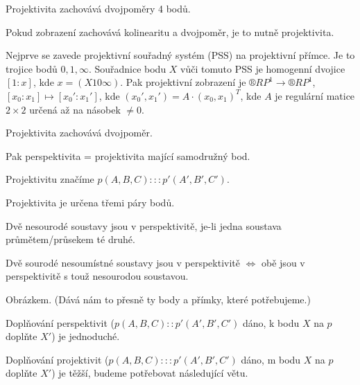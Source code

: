 \documentclass[12pt]{article}					%
\begin{document}
\begin{dusledek}
	Projektivita zachovává dvojpoměry 4 bodů.
\end{dusledek}

\begin{tvrzeni}
	Pokud zobrazení zachovává kolinearitu a dvojpoměr, je to nutně projektivita.
\end{tvrzeni}

\begin{poznamka}
	Nejprve se zavede projektivní souřadný systém (PSS) na projektivní přímce. Je to trojice bodů $0, 1, ∞$. Souřadnice bodu $X$ vůči tomuto PSS je homogenní dvojice $[1:x]$, kde $x = (X 1 0 ∞)$. Pak projektivní zobrazení je $®RP^1 \rightarrow ®RP^1$, $[x_0:x_1] \mapsto [x_0':x_1']$, kde $(x_0', x_1') = A·(x_0, x_1)^T$, kde $A$ je regulární matice $2 \times 2$ určená až na násobek $≠0$.

	\begin{dusledekin}
		Projektivita zachovává dvojpoměr.
	\end{dusledekin}

	Pak perspektivita = projektivita mající samodružný bod.
\end{poznamka}

\begin{poznamka}
	Projektivitu značíme $p(A, B, C) ::: p'(A', B', C')$.

	\begin{poznamkain}
		Projektivita je určena třemi páry bodů.
	\end{poznamkain}
\end{poznamka}

\begin{definice}
	Dvě nesourodé soustavy jsou v perspektivitě, je-li jedna soustava průmětem/průsekem té druhé.
\end{definice}

\begin{veta}
	Dvě sourodé nesoumístné soustavy jsou v perspektivitě $\Leftrightarrow$ obě jsou v perspektivitě s touž nesourodou soustavou.

	\begin{dukazin}
		Obrázkem. (Dává nám to přesně ty body a přímky, které potřebujeme.)
	\end{dukazin}
\end{veta}

\begin{poznamka}
	Doplňování perspektivit ($p(A, B, C)::p'(A', B', C')$ dáno, k bodu $X$ na $p$ doplňte $X'$) je jednoduché.

	Doplňování projektivit ($p(A, B, C):::p'(A', B', C')$ dáno, m bodu $X$ na $p$ doplňte $X'$) je těžší, budeme potřebovat následující větu.
\end{poznamka}
\end{document}
